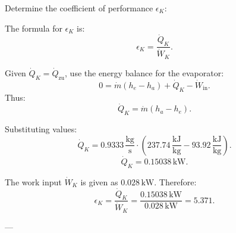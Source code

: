 Determine the coefficient of performance \( \epsilon_K \):  

The formula for \( \epsilon_K \) is:  
\[
\epsilon_K = \frac{\dot{Q}_K}{\dot{W}_K}.
\]  

Given \( \dot{Q}_K = \dot{Q}_\text{zu} \), use the energy balance for the evaporator:  
\[
0 = \dot{m} (h_e - h_a) + \dot{Q}_K - \dot{W}_{\text{in}}.
\]  
Thus:  
\[
\dot{Q}_K = \dot{m} (h_a - h_e).
\]  

Substituting values:  
\[
\dot{Q}_K = 0.9333 \, \frac{\text{kg}}{\text{s}} \cdot (237.74 \, \frac{\text{kJ}}{\text{kg}} - 93.92 \, \frac{\text{kJ}}{\text{kg}}).
\]  
\[
\dot{Q}_K = 0.15038 \, \text{kW}.
\]  

The work input \( \dot{W}_K \) is given as \( 0.028 \, \text{kW} \). Therefore:  
\[
\epsilon_K = \frac{\dot{Q}_K}{\dot{W}_K} = \frac{0.15038 \, \text{kW}}{0.028 \, \text{kW}} = 5.371.
\]  

---